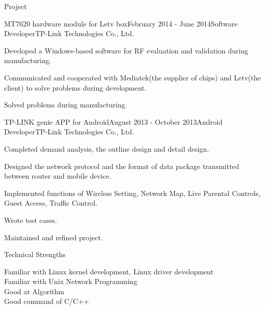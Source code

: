 \documentclass{resume} %
\begin{document}
\begin{rSection}{Project}

\begin{rSubsection}{MT7620 hardware module for Letv box}{February 2014 - June 2014}{Software Developer}{TP-Link Technologies Co., Ltd.}
	\item Developed a Windows-based software for RF evaluation and validation during manufacturing.
	\item Communicated and cooperated with Mediatek(the supplier of chips) and Letv(the client) to solve problems during development.
	\item Solved problems during manufacturing.
\end{rSubsection}


\begin{rSubsection}{TP-LINK genie APP for Android}{August 2013 - October 2013}{Android Developer}{TP-Link Technologies Co., Ltd.}
\item Completed demand analysis, the outline design and detail design.
\item Designed the network protocol and the format of data package transmitted between router and mobile device.
\item Implemented functions of Wireless Setting, Network Map, Live Parental Controls, Guest Access, Traffic Control.
\item Wrote test cases.
\item Maintained and refined project.
\end{rSubsection}

\end{rSection}


\begin{rSection}{Technical Strengths}

Familiar with Linux kernel development, Linux driver development\\
Familiar with Unix Network Programming\\
Good at Algorithm \\
Good command of C/C++ 

\end{rSection}
\end{document}
